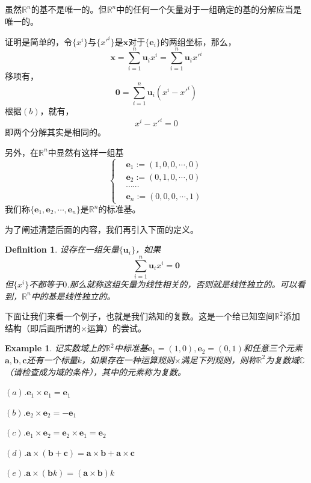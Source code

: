 \documentclass[11pt,a4paper,openany]{book}%
\theoremstyle{plain}%
\newtheorem{defi}{Definition}[chapter]%
\newtheorem{exa}{Example}[chapter]%
\begin{document}
\indent 虽然$\mathbb{R}^{n}$的基不是唯一的。但$\mathbb{R}^{n}$中的任何一个矢量对于一组确定的基的分解应当是唯一的。

证明是简单的，令$\{x^{i}\}$与$\{x'^{i}\}$是$\bm{x}$对于$\{\bm{e}_{i}\}$的两组坐标，那么，
\[
\bm{x}=\sum_{i=1}^{n}\bm{u}_{i}x^{i}=\sum_{i=1}^{n}\bm{u}_{i}x'^{i}
\]
移项有，
\[
\bm{0}=\sum_{i=1}^{n}\bm{u}_{i}(x^{i}-x'^{i})
\]
根据$(b)$，就有，
\[x^{i}-x'^{i}=0\]
即两个分解其实是相同的。

另外，在$\mathbb{R}^{n}$中显然有这样一组基
\begin{equation*}
\left\{
\begin{split}
&\bm{e}_{1}:=(1,0,0,\cdots,0)\\
&\bm{e}_{2}:=(0,1,0,\cdots,0)\\
&\cdots \cdots \\
&\bm{e}_{n}:=(0,0,0,\cdots,1)
\end{split}
\right.
\end{equation*}
我们称$\{\bm{e}_{1},\bm{e}_{2},\cdots,\bm{e}_{n}\}$是$\mathbb{R}^{n}$的标准基。

为了阐述清楚后面的内容，我们再引入下面的定义。
\begin{defi}
设存在一组矢量$\{\bm{u}_{i}\}$，如果
\[
\sum_{i=1}^{n}\bm{u}_{i}x^{i}=\bm{0}
\]
但$\{x^{i}\}$不都等于$0$.那么就称这组矢量为{\kaishu 线性相关}的，否则就是{\kaishu 线性独立}的。可以看到，$\mathbb{R}^{n}$中的基是线性独立的。
\end{defi}
\label{a18}
\indent 下面让我们来看一个例子，也就是我们熟知的复数。这是一个给已知空间$\mathbb{R}^{2}$添加结构（即后面所谓的$\times$运算）的尝试。
\begin{exa}
记实数域上的$\mathbb{R}^{2}$中标准基$\bm{e}_{1}=(1,0),\bm{e}_{2}=(0,1)$和任意三个元素$\bm{a},\bm{b},\bm{c}$还有一个标量$k$，如果存在一种运算规则$\times$满足下列规则，则称$\mathbb{R}^{2}$为复数域$\mathbb{C}$（请检查成为域的条件），其中的元素称为复数。

$(a)$.$\bm{e}_{1}\times \bm{e}_{1}=\bm{e}_{1}$

$(b)$.$\bm{e}_{2}\times \bm{e}_{2}=-\bm{e}_{1}$

$(c)$.$\bm{e}_{1}\times \bm{e}_{2}=\bm{e}_{2}\times \bm{e}_{1}=\bm{e}_{2}$

$(d)$.$\bm{a}\times(\bm{b}+\bm{c})=\bm{a}\times \bm{b}+\bm{a}\times \bm{c}$

$(e)$.$\bm{a}\times(\bm{b}k)=(\bm{a}\times \bm{b})k$
\end{exa}
\end{document}
